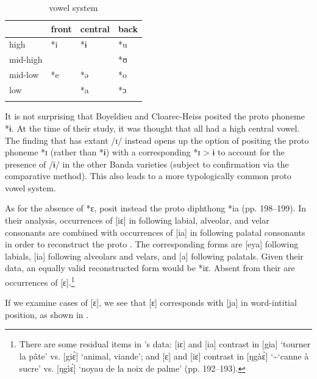 \documentclass[output=paper,colorlinks,citecolor=brown]{langscibook}
\begin{document}
\begin{table}
\caption{ vowel system \citep{BoyeldieuCloarec-Heiss2001}}
\label{tab:olson:12}
    \begin{tabular}{llll}
    \lsptoprule
                    & front & central   & back\\
    \midrule
        high        & *i    & *ɨ        & *u\\
        mid-high    &       &           & *ʊ\\
        mid-low     & *e    & *ə        & *o\\
        low         &       & *a        & *ɔ\\
    \lspbottomrule
    \end{tabular}
\end{table}

It is not surprising that Boyeldieu and Cloarec-Heiss posited the proto phoneme *ɨ. At the time of their study, it was thought that all  had a high central vowel. The finding that  has extant /ɪ/ instead opens up the option of positing the proto phoneme *ɪ (rather than *ɨ) with a corresponding  *ɪ > ɨ to account for the presence of /ɨ/ in the other Banda  varieties (subject to confirmation via the comparative method). This also leads to a more typologically  common proto vowel system.

As for the absence of *ɛ, \citeauthor{BoyeldieuCloarec-Heiss2001} posit instead the proto diphthong *ia (pp. 198--199). In their analysis, occurrences of [iɛ] in  following labial, alveolar, and velar consonants are combined with occurrences of [ia] in  following palatal consonants in order to reconstruct the proto . The corresponding  forms are [eya] following labials, [ia] following alveolars and velars, and [a] following palatals. Given their data, an equally valid reconstructed form would be *iɛ. Absent from their  are occurrences of [ɛ].\footnote{There are some residual items in \citeauthor{BoyeldieuCloarec-Heiss2001}'s data: [iɛ] and [ia] contrast in [gia] ‘tourner la pâte’ vs. [giɛ̀] ‘animal, viande’; and [ɛ] and [iɛ] contrast in [ŋgàɛ̀] \char`\~ \space [ŋgɛ̀] ‘canne à sucre’ vs. [ŋgìɛ́] ‘noyau de la noix de palme’ (pp. 192--193).}

If we examine cases of [ɛ], we see that  [ɛ] corresponds with  [ja] \citep{Moñino1988} in word-intitial position, as shown in .
\end{document}
